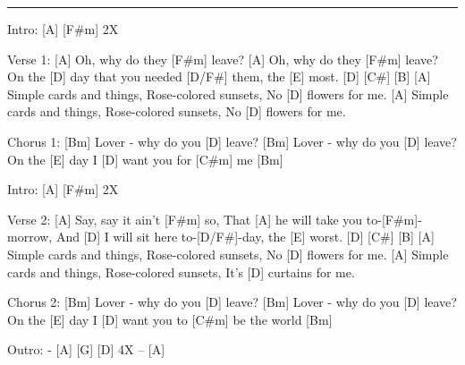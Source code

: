 \noindent\rule{\columnwidth}{1pt}

\begin{lstsong}
Intro: [A] [F#m] 2X

Verse 1:
[A] Oh, why do they [F#m] leave?
[A] Oh, why do they [F#m] leave?
On the [D] day that you needed [D/F#] them, the [E] most. [D] [C#] [B]  
[A] Simple cards and things, Rose-colored sunsets, No [D] flowers for me.
[A] Simple cards and things, Rose-colored sunsets, No [D] flowers for me.  

Chorus 1:
[Bm] Lover - why do you [D] leave?
[Bm] Lover - why do you [D] leave?
On the [E] day I [D] want you for [C#m] me [Bm]

Intro: [A] [F#m] 2X

Verse 2:
[A] Say, say it ain't [F#m] so,
That [A] he will take you to-[F#m]-morrow, 
And [D] I will sit here to-[D/F#]-day, the [E] worst. [D] [C#] [B]
[A] Simple cards and things, Rose-colored sunsets, No [D] flowers for me.
[A] Simple cards and things, Rose-colored sunsets, It's [D] curtains for  me.

Chorus 2:
[Bm] Lover - why do you [D] leave?
[Bm] Lover - why do you [D] leave?
On the [E] day I [D] want you to [C#m] be the world [Bm]

Outro:
 - [A] [G] [D] 4X -- [A]
\end{lstsong}
\newpage

